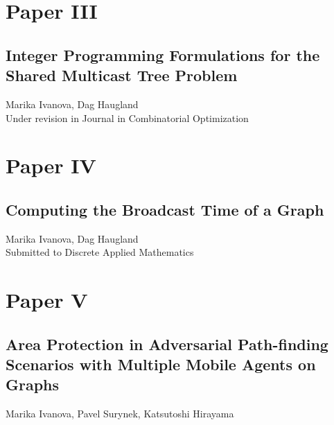 \chapter*{Paper III}
\section{Integer Programming Formulations for the Shared Multicast Tree Problem}

\noindent Marika Ivanova, Dag Haugland\\

\noindent Under revision in Journal in Combinatorial Optimization
\cleardoublepage


\chapter*{Paper IV}
\section{Computing the Broadcast Time of a Graph}

\noindent Marika Ivanova, Dag Haugland\\

\noindent Submitted to Discrete Applied Mathematics
\cleardoublepage


\chapter*{Paper V}
\section{Area Protection in Adversarial Path-finding Scenarios with Multiple Mobile Agents on Graphs}

\noindent Marika Ivanova, Pavel Surynek,  Katsutoshi Hirayama\\

